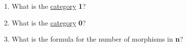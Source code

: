 \begin{enumerate}
    \item What is the \hyperref[D3.7]{category} \textbf{1}?
    \item What is the \hyperref[D3.7]{category} \textbf{0}?
    \item What is the formula for the number of morphisms in \textbf{n}?

  \end{enumerate}
